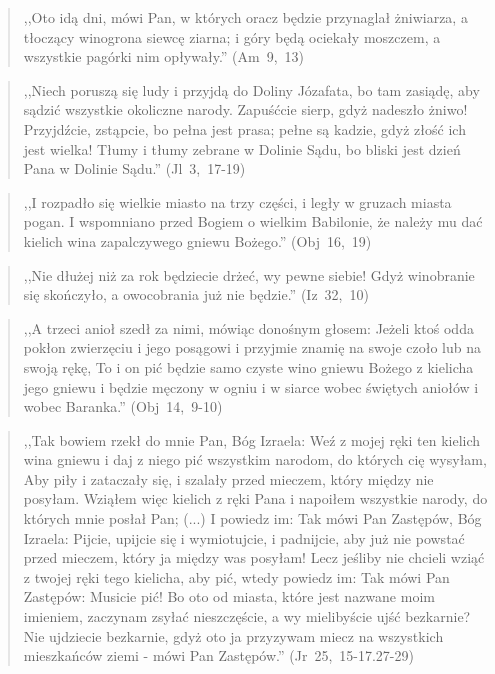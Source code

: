 \documentclass[10pt,a4paper,oneside]{article}
\begin{document}
\begin{quote}
,,Oto idą dni, mówi Pan, w których oracz będzie przynaglał żniwiarza, a tłoczący winogrona siewcę ziarna; i góry będą ociekały moszczem, a wszystkie pagórki nim opływały.'' (Am~9,~13)
\end{quote}
\begin{quote}
,,Niech poruszą się ludy i przyjdą do Doliny Józafata, bo tam zasiądę, aby sądzić wszystkie okoliczne narody. Zapuśćcie sierp, gdyż nadeszło żniwo! Przyjdźcie, zstąpcie, bo pełna jest prasa; pełne są kadzie, gdyż złość ich jest wielka! Tłumy i tłumy zebrane w Dolinie Sądu, bo bliski jest dzień Pana w Dolinie Sądu.'' (Jl~3,~17-19)
\end{quote}
\begin{quote}
,,I rozpadło się wielkie miasto na trzy części, i legły w gruzach miasta pogan. I wspomniano przed Bogiem o wielkim Babilonie, że należy mu dać kielich wina zapalczywego gniewu Bożego.'' (Obj~16,~19)
\end{quote}
\begin{quote}
,,Nie dłużej niż za rok będziecie drżeć, wy pewne siebie! Gdyż winobranie się skończyło, a owocobrania już nie będzie.'' (Iz~32,~10)
\end{quote}
\begin{quote}
,,A trzeci anioł szedł za nimi, mówiąc donośnym głosem: Jeżeli ktoś odda pokłon zwierzęciu i jego posągowi i przyjmie znamię na swoje czoło lub na swoją rękę, To i on pić będzie samo czyste wino gniewu Bożego z kielicha jego gniewu i będzie męczony w ogniu i w siarce wobec świętych aniołów i wobec Baranka.'' (Obj~14,~9-10)
\end{quote}
\begin{quote}
,,Tak bowiem rzekł do mnie Pan, Bóg Izraela: Weź z mojej ręki ten kielich wina gniewu i daj z niego pić wszystkim narodom, do których cię wysyłam, Aby piły i zataczały się, i szalały przed mieczem, który między nie posyłam. Wziąłem więc kielich z ręki Pana i napoiłem wszystkie narody, do których mnie posłał Pan; (...) I powiedz im: Tak mówi Pan Zastępów, Bóg Izraela: Pijcie, upijcie się i wymiotujcie, i padnijcie, aby już nie powstać przed mieczem, który ja między was posyłam! Lecz jeśliby nie chcieli wziąć z twojej ręki tego kielicha, aby pić, wtedy powiedz im: Tak mówi Pan Zastępów: Musicie pić! Bo oto od miasta, które jest nazwane moim imieniem, zaczynam zsyłać nieszczęście, a wy mielibyście ujść bezkarnie? Nie ujdziecie bezkarnie, gdyż oto ja przyzywam miecz na wszystkich mieszkańców ziemi - mówi Pan Zastępów.'' (Jr~25,~15-17.27-29)
\end{quote}
\end{document}
